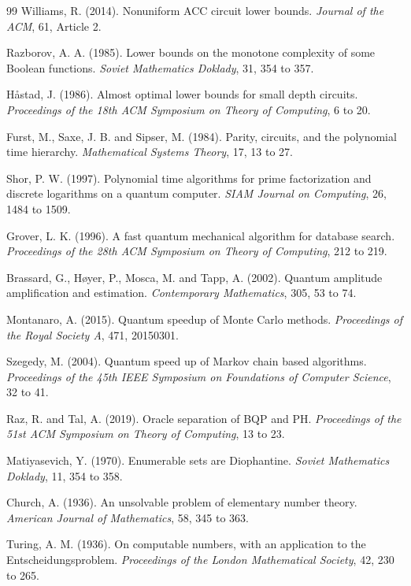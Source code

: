 \documentclass[11pt,twoside,openany]{book}
\theoremstyle{plain}
\theoremstyle{definition}
\theoremstyle{remark}
\begin{document}
\begin{thebibliography}{99}
 Williams, R. (2014). Nonuniform ACC circuit lower bounds. \emph{Journal of the ACM}, 61, Article 2.

 Razborov, A. A. (1985). Lower bounds on the monotone complexity of some Boolean functions. \emph{Soviet Mathematics Doklady}, 31, 354 to 357.

 H{\aa}stad, J. (1986). Almost optimal lower bounds for small depth circuits. \emph{Proceedings of the 18th ACM Symposium on Theory of Computing}, 6 to 20.

 Furst, M., Saxe, J. B. and Sipser, M. (1984). Parity, circuits, and the polynomial time hierarchy. \emph{Mathematical Systems Theory}, 17, 13 to 27.

 Shor, P. W. (1997). Polynomial time algorithms for prime factorization and discrete logarithms on a quantum computer. \emph{SIAM Journal on Computing}, 26, 1484 to 1509.

 Grover, L. K. (1996). A fast quantum mechanical algorithm for database search. \emph{Proceedings of the 28th ACM Symposium on Theory of Computing}, 212 to 219.

 Brassard, G., H{\o}yer, P., Mosca, M. and Tapp, A. (2002). Quantum amplitude amplification and estimation. \emph{Contemporary Mathematics}, 305, 53 to 74.

 Montanaro, A. (2015). Quantum speedup of Monte Carlo methods. \emph{Proceedings of the Royal Society A}, 471, 20150301.

 Szegedy, M. (2004). Quantum speed up of Markov chain based algorithms. \emph{Proceedings of the 45th IEEE Symposium on Foundations of Computer Science}, 32 to 41.

 Raz, R. and Tal, A. (2019). Oracle separation of BQP and PH. \emph{Proceedings of the 51st ACM Symposium on Theory of Computing}, 13 to 23.

 Matiyasevich, Y. (1970). Enumerable sets are Diophantine. \emph{Soviet Mathematics Doklady}, 11, 354 to 358.

 Church, A. (1936). An unsolvable problem of elementary number theory. \emph{American Journal of Mathematics}, 58, 345 to 363.

 Turing, A. M. (1936). On computable numbers, with an application to the Entscheidungsproblem. \emph{Proceedings of the London Mathematical Society}, 42, 230 to 265.


\end{thebibliography}
\end{document}
